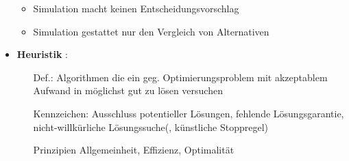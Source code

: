 \documentclass[12pt]{article}
\begin{document}
\begin{itemize}
\begin{itemize}
				\item Simulation macht keinen Entscheidungsvorschlag
				\item Simulation gestattet nur den Vergleich von Alternativen
			\end{itemize}		
		\item \textbf{Heuristik} \label{Heuristik}: 
			\begin{itemize}
				\item[Def.:] Algorithmen die ein geg. Optimierungsproblem mit akzeptablem Aufwand in möglichst gut zu lösen versuchen
				\item[Kennzeichen:] Ausschluss potentieller Lösungen, fehlende Lösungsgarantie, nicht-willkürliche Lösungssuche(, künstliche Stoppregel)
				\item[Prinzipien] Allgemeinheit, Effizienz, Optimalität	\\
\end{itemize}
\end{itemize}
\end{document}
